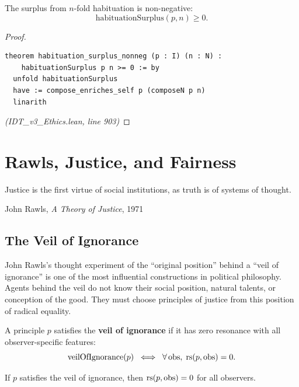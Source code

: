 \begin{theorem}
\label{thm:habituation-surplus}
The surplus from $n$-fold habituation is non-negative:
\[
  \mathrm{habituationSurplus}(p, n) \geq 0.
\]
\end{theorem}

\begin{proof}
\begin{lstlisting}
theorem habituation_surplus_nonneg (p : I) (n : N) :
    habituationSurplus p n >= 0 := by
  unfold habituationSurplus
  have := compose_enriches_self p (composeN p n)
  linarith
\end{lstlisting}
\textit{(IDT\_v3\_Ethics.lean, line 903)}
\end{proof}



\chapter{Rawls, Justice, and Fairness}
\label{ch:rawls}

\epigraph{Justice is the first virtue of social institutions, as truth is of systems of thought.}{John Rawls, \textit{A Theory of Justice}, 1971}

\section{The Veil of Ignorance}

John Rawls's thought experiment of the ``original position'' behind a ``veil of
ignorance'' is one of the most influential constructions in political philosophy.
Agents behind the veil do not know their social position, natural talents, or
conception of the good. They must choose principles of justice from this
position of radical equality.

\begin{definition}
\label{def:veil}
A principle $p$ satisfies the \textbf{veil of ignorance} if it has zero
resonance with all observer-specific features:
\[
  \mathrm{veilOfIgnorance}(p) \;\iff\; \forall\, \mathrm{obs},\; \mathrm{rs}(p, \mathrm{obs}) = 0.
\]
\end{definition}

\begin{theorem}
\label{thm:veil-zero}
If $p$ satisfies the veil of ignorance, then $\mathrm{rs}(p, \mathrm{obs}) = 0$ for
all observers.
\end{theorem}


